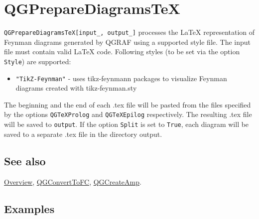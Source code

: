 \documentclass[../FeynHelpersManual.tex]{subfiles}
\begin{document}
\hypertarget{qgpreparediagramstex}{
\section{QGPrepareDiagramsTeX}\label{qgpreparediagramstex}}

\texttt{QGPrepareDiagramsTeX[\allowbreak{}input_,\ \allowbreak{}output_]}
processes the LaTeX representation of Feynman diagrams generated by
QGRAF using a supported style file. The input file must contain valid
LaTeX code. Following styles (to be set via the option \texttt{Style})
are supported:

\begin{itemize}
\tightlist
\item
  \texttt{"TikZ-Feynman"} - uses tikz-feynmann packages to visualize
  Feynman diagrams created with tikz-feynman.sty
\end{itemize}

The beginning and the end of each .tex file will be pasted from the
files specified by the options \texttt{QGTeXProlog} and
\texttt{QGTeXEpilog} respectively. The resulting .tex file will be saved
to \texttt{output}. If the option \texttt{Split} is set to
\texttt{True}, each diagram will be saved to a separate .tex file in the
directory output.

\subsection{See also}

\hyperlink{toc}{Overview}, \hyperlink{qgconverttofc}{QGConvertToFC},
\hyperlink{qgcreateamp}{QGCreateAmp}.

\subsection{Examples}
\end{document}
